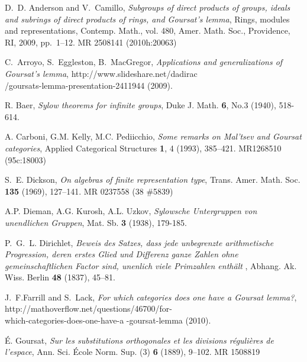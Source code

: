 \documentclass[11pt]{article}
\theoremstyle{change}
\newcommand{\<}{\langle}
\renewcommand{\>}{\rangle}
\begin{document}
\providecommand{\bysame}{\leavevmode\hbox to3em{\hrulefill}\thinspace}
\providecommand{\MR}{\relax\ifhmode\unskip\space\fi MR }
\providecommand{\MRhref}[2]{%
  \href{http://www.ams.org/mathscinet-getitem?mr=#1}{#2}
}
\providecommand{\href}[2]{#2}
\begin{thebibliography}{{S. }09}

D.~D. Anderson and V.~Camillo, \emph{Subgroups of direct products of groups,
  ideals and subrings of direct products of rings, and {G}oursat's lemma},
  Rings, modules and representations, Contemp. Math., vol. 480, Amer. Math.
  Soc., Providence, RI, 2009, pp.~1--12. \MR{2508141 (2010h:20063)}

C.~Arroyo, S.~Eggleston, B.~MacGregor,
 \emph{Applications and generalizations of {G}oursat's lemma},
  http://www.slideshare.net/dadirac\\ /goursats-lemma-presentation-2411944 (2009).

R. Baer, \emph{Sylow theorems for infinite groups}, Duke J. Math. {\bf 6},
No.3 (1940), 518-614.

A. Carboni, G.M. Kelly, M.C. Pediicchio, \emph{Some remarks on Mal'tsev and 
Goursat 
categories}, Applied Categorical Structures {\bf 1}, 4 (1993), 385--421. 
MR{1268510 (95c:18003)}


S.~E. Dickson, \emph{On algebras of finite representation type}, Trans.
  Amer. Math. Soc. \textbf{135} (1969), 127--141. \MR{0237558 (38 \#5839)}

A.P. Dieman, A.G. Kurosh, A.L. Uzkov, \emph{Sylowsche Untergruppen von unendlichen Gruppen}, Mat. Sb. {\bf 3} (1938), 179-185.

  P.~G.~L. Dirichlet, \emph{ Beweis des Satzes, dass jede unbegrenzte arithmetische Progression, deren erstes Glied und Differenz ganze Zahlen ohne gemeinschaftlichen Factor sind, unenlich viele Primzahlen enth\"alt }, Abhang. Ak. Wiss. Berlin {\bf 48} (1837), 45--81.

J.~F.Farrill and S.~Lack, \emph{For which categories does one have a
  {G}oursat lemma?},
  http://mathoverflow.net/questions/46700/for-\\ which-categories-does-one-have-a%
-goursat-lemma (2010).

\'E. Goursat, \emph{Sur les substitutions orthogonales et les divisions
  r{\'e}guli{\`e}res de l'espace}, Ann. Sci. {\'E}cole Norm. Sup. (3)
  \textbf{6} (1889), 9--102. \MR{1508819}


\end{thebibliography}
\end{document}

